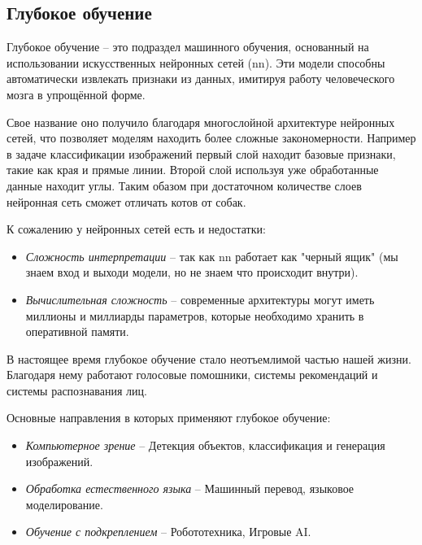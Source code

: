 \documentclass[../part_1.tex]{subfiles}
\begin{document}
\subsection{Глубокое обучение}
\par Глубокое обучение -- это подраздел машинного обучения, основанный на использовании искусственных нейронных сетей (\acrshort{nn}). Эти модели способны автоматически извлекать признаки из данных, имитируя работу человеческого мозга в упрощённой форме.
\par Свое название оно получило благодаря многослойной архитектуре нейронных сетей, что позволяет моделям находить более сложные закономерности. Например в задаче классификации изображений первый слой находит базовые признаки, такие как края и прямые линии. Второй слой используя уже обработанные данные находит углы. Таким обазом при достаточном количестве слоев нейронная сеть сможет отличать котов от собак. 
\par К сожалению у нейронных сетей есть и недостатки:
\begin{itemize}
    \item \textit{Сложность интерпретации} -- так как \acrshort{nn} работает как "черный ящик" (мы знаем вход и выходи модели, но не знаем что происходит внутри).
    \item \textit{Вычислительная сложность} -- современные архитектуры могут иметь миллионы и миллиарды параметров, которые необходимо хранить в оперативной памяти.
\end{itemize}
\par В настоящее время глубокое обучение стало неотъемлимой частью нашей жизни. Благодаря нему работают голосовые помошники, системы рекомендаций и системы распознавания лиц.
\par Основные направления в которых применяют глубокое обучение:
\begin{itemize}
    \item \textit{Компьютерное зрение} -- Детекция объектов, классификация и генерация изображений.
    \item \textit{Обработка естественного языка} -- Машинный перевод, языковое моделирование.
    \item \textit{Обучение с подкреплением} -- Робототехника, Игровые AI.
\end{itemize}
\end{document}
